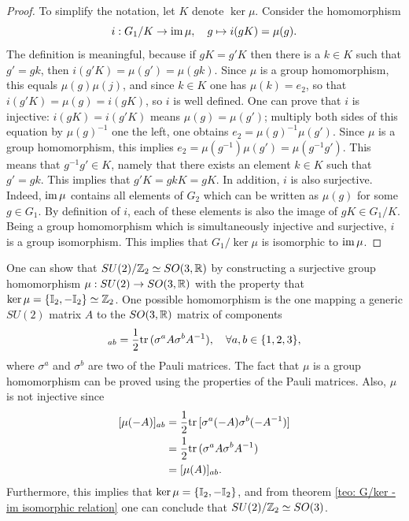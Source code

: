 \begin{proof}
    To simplify the notation, let $K$ denote $\ker{\mu}$. Consider the homomorphism 
    \begin{equation}
        i : G_1/K \to \mathrm{im}\,{\mu},\quad g\mapsto i(gK) = \mu(g).
    \end{equation}
    The definition is meaningful, because if $gK = g'K$ then there is a $k \in K$  such that $g' = gk$, then $i(g'K) = \mu(g') = \mu(gk)$. Since $\mu$ is a group homomorphism, this equals $\mu(g)\mu(j)$, and since $k \in K$ one has $\mu(k) = e_2$, so that $i(g'K) = \mu(g) = i(gK)$, so $i$ is well defined. One can prove that $i$ is injective: $i(gK) = i(g'K)$ means $\mu(g) = \mu(g')$; multiply both sides of this equation by $\mu(g)^{-1}$ one the left, one obtains $e_2 = \mu(g)^{-1}\mu(g')$. Since $\mu$ is a group homomorphism, this implies $e_2 = \mu(g^{-1})\mu(g') = \mu(g^{-1}g')$. This means that $g^{-1}g' \in K$, namely that there exists an element $k \in K$ such that $g' = gk$. This implies that $g'K = gkK = gK$. In addition, $i$ is also surjective. Indeed, $\mathrm{im}\,{\mu}$ contains all elements of $G_2$ which can be written as $\mu(g)$ for some $g \in G_1$. By definition of $i$, each of these elements is also the image of $gK \in G_1/K$. Being a group homomorphism which is simultaneously injective and surjective, $i$ is a group isomorphism. This implies that $G_1/\ker{\mu}$ is isomorphic to $\mathrm{im}\,{\mu}$.
\end{proof}
\begin{ex}
    One can show that $SU(2)/\mathbb{Z}_2 \simeq SO(3,\mathbb{R})$ by constructing a surjective group homomorphism $\mu : SU(2) \to SO(3,\mathbb{R})$ with the property that $\ker{\mu} = \{\mathbb{I}_2, -\mathbb{I}_2\} \simeq \mathbb{Z}_2$. One possible homomorphism is the one mapping a generic $SU(2)$ matrix $A$ to the $SO(3,\mathbb{R})$ matrix of components
    \begin{equation}
        [\mu(A)]_{ab} = \frac{1}{2}\tr{(\sigma^a A \sigma^b A^{-1})},\quad \forall a,b \in \{1,2,3\},
    \end{equation}
    where $\sigma^a$ and $\sigma^b$ are two of the Pauli matrices. The fact that $\mu$ is a group homomorphism can be proved using the properties of the Pauli matrices. Also, $\mu$ is not injective since
    \begin{equation}
        \begin{split}
            [\mu(-A)]_{ab} &= \frac{1}{2}\mathrm{tr}\,{[\sigma^a(-A)\sigma^b(-A^{-1})]} \\
            &= \frac{1}{2}\mathrm{tr}\,{(\sigma^a A \sigma^b A^{-1})} \\
            &= [\mu(A)]_{ab}.
        \end{split}
    \end{equation}
    Furthermore, this implies that $\ker{\mu}  = \{\mathbb{I}_2, -\mathbb{I}_2\}$, and from theorem \ref{teo: G/ker - im isomorphic relation} one can conclude that $SU(2)/\mathbb{Z}_2 \simeq SO(3)$.
\end{ex}
